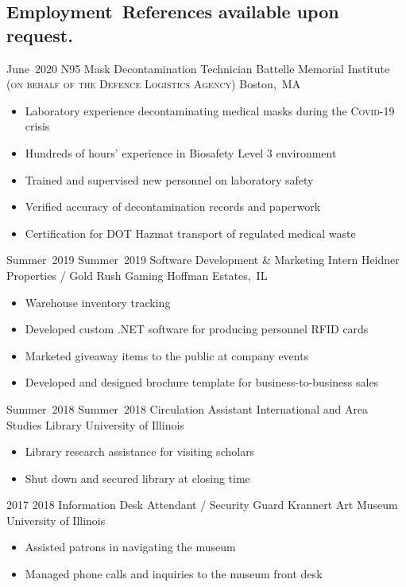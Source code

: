 \subsection*{Employment\hfill\ {\footnotesize References available upon request.}}
\secitemexperience
	{June~2020}
	{}
	{N95 Mask Decontamination Technician}
	{Battelle Memorial Institute {\scshape\footnotesize (on behalf of the Defence Logistics Agency)}}
	{Boston,~MA}
	{
		\begin{itemize}
			\vspace{-2mm}
			\item Laboratory experience decontaminating medical masks during the {\scshape Covid-19} crisis
			\item Hundreds of hours' experience in Biosafety Level 3 environment
			\item Trained and supervised new personnel on laboratory safety
			\item Verified accuracy of decontamination records and paperwork
			\item Certification for DOT Hazmat transport of regulated medical waste
			\vspace{-2mm}
		\end{itemize}
	}
\secitemexperience
	{Summer~2019}
	{Summer~2019}
	{Software Development \& Marketing Intern}
	{Heidner Properties / Gold Rush Gaming}
	{Hoffman Estates,~IL}
	{
		\begin{itemize}
			\vspace{-2mm}
			\item Warehouse inventory tracking
			\item Developed custom .NET software for producing personnel RFID cards
			\item Marketed giveaway items to the public at company events
			\item Developed and designed brochure template for business-to-business sales
			\vspace{-2mm}
		\end{itemize}
	}
\secitemexperience
	{Summer~2018}
	{Summer~2018}
	{Circulation Assistant}
	{International and Area Studies Library}
	{University of Illinois}
	{
		\begin{itemize}
			\vspace{-2mm}
			\item Library research assistance for visiting scholars
			\item Shut down and secured library at closing time
			\vspace{-2mm}
		\end{itemize}
	}
\secitemexperience
	{2017}
	{2018}
	{Information Desk Attendant / Security Guard}
	{Krannert Art Museum}
	{University of Illinois}
    {
		\begin{itemize}
			\vspace{-2mm}
			\item Assisted patrons in navigating the museum
			\item Managed phone calls and inquiries to the museum front desk
			\vspace{-2mm}
		\end{itemize}
    }
	
